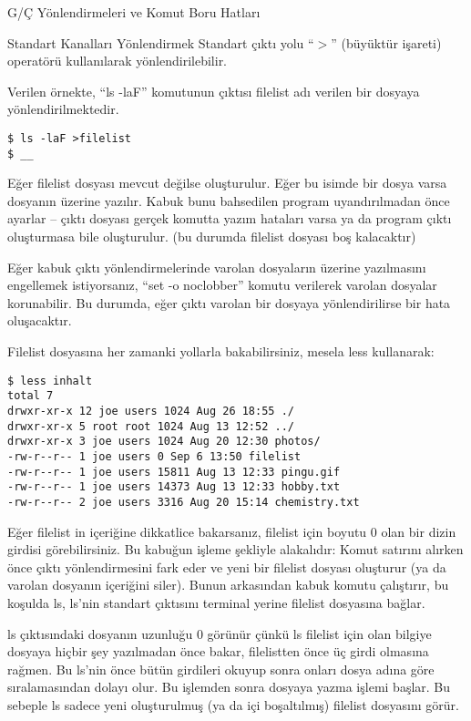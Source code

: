 \begin{section}{G/Ç Yönlendirmeleri ve Komut Boru Hatları}
\begin{subsection}{Standart Kanalları Yönlendirmek}
Standart çıktı yolu “$>$” (büyüktür işareti) operatörü kullanılarak yönlendirilebilir.

Verilen örnekte, “ls -laF” komutunun çıktısı filelist adı verilen bir  dosyaya yönlendirilmektedir.
\footnotesize
\begin{verbatim}
$ ls -laF >filelist 
$ __
\end{verbatim}
\normalsize

Eğer filelist dosyası mevcut değilse oluşturulur. Eğer bu isimde bir dosya varsa dosyanın üzerine yazılır. Kabuk bunu bahsedilen program uyandırılmadan önce ayarlar – çıktı dosyası gerçek komutta yazım hataları varsa ya da program çıktı oluşturmasa bile oluşturulur. (bu durumda filelist dosyası boş kalacaktır)

Eğer kabuk çıktı yönlendirmelerinde varolan dosyaların üzerine yazılmasını engellemek istiyorsanız, “set -o noclobber” komutu verilerek varolan dosyalar korunabilir. Bu durumda, eğer çıktı varolan bir dosyaya yönlendirilirse bir hata oluşacaktır.

Filelist dosyasına her zamanki yollarla bakabilirsiniz, mesela less kullanarak:
\footnotesize
\begin{verbatim}
$ less inhalt 
total 7 
drwxr-xr-x 12 joe users 1024 Aug 26 18:55 ./
drwxr-xr-x 5 root root 1024 Aug 13 12:52 ../
drwxr-xr-x 3 joe users 1024 Aug 20 12:30 photos/
-rw-r--r-- 1 joe users 0 Sep 6 13:50 filelist
-rw-r--r-- 1 joe users 15811 Aug 13 12:33 pingu.gif
-rw-r--r-- 1 joe users 14373 Aug 13 12:33 hobby.txt
-rw-r--r-- 2 joe users 3316 Aug 20 15:14 chemistry.txt
\end{verbatim}
\normalsize

Eğer filelist in içeriğine dikkatlice bakarsanız, filelist için boyutu 0 olan bir dizin girdisi görebilirsiniz. Bu kabuğun işleme şekliyle alakalıdır: Komut satırını alırken önce çıktı yönlendirmesini fark eder ve yeni bir filelist dosyası oluşturur (ya da varolan dosyanın içeriğini siler). Bunun arkasından kabuk komutu çalıştırır, bu koşulda ls, ls'nin standart çıktısını terminal yerine filelist dosyasına bağlar. 

ls çıktısındaki dosyanın uzunluğu 0 görünür çünkü ls filelist için olan bilgiye dosyaya hiçbir şey yazılmadan önce bakar, filelistten önce üç girdi olmasına rağmen. Bu ls'nin önce bütün girdileri okuyup sonra onları dosya adına göre sıralamasından dolayı olur. Bu işlemden sonra dosyaya yazma işlemi başlar. Bu sebeple ls sadece yeni oluşturulmuş (ya da içi boşaltılmış) filelist dosyasını görür.


\end{subsection}
\end{section}
